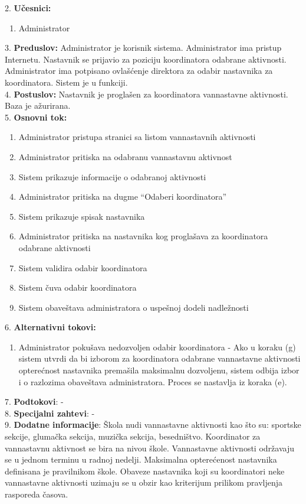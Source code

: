 \documentclass{article}
\begin{document}
2. \textbf{Učesnici:}
\begin{enumerate} [label=(\alph*)]
\item Administrator
\end{enumerate} 

3. \textbf{Preduslov:} Administrator je korisnik sistema. Administrator ima pristup Internetu. Nastavnik se prijavio za poziciju koordinatora odabrane aktivnosti. Administrator ima potpisano ovlašćenje direktora za odabir nastavnika za koordinatora. Sistem je u funkciji. \\

4. \textbf{Postuslov:} Nastavnik je proglašen za koordinatora vannastavne aktivnosti. Baza je ažurirana. \\

5. \textbf{Osnovni tok:} 
\begin{enumerate} [label=(\alph*)]
\item Administrator pristupa stranici sa listom vannastavnih aktivnosti
\item Administrator pritiska na odabranu vannastavnu aktivnost
\item Sistem prikazuje informacije o odabranoj aktivnosti
\item Administrator pritiska na dugme ``Odaberi koordinatora''
\item Sistem prikazuje spisak nastavnika
\item Administrator pritiska na nastavnika kog proglašava za koordinatora odabrane aktivnosti
\item Sistem validira odabir koordinatora
\item Sistem čuva odabir koordinatora
\item Sistem obaveštava administratora o uspešnoj dodeli nadležnosti
\end{enumerate}

6. \textbf{Alternativni tokovi:}
\begin{enumerate} [label=(\roman*)]
    \item Administrator pokušava nedozvoljen odabir koordinatora - Ako u koraku (g) sistem utvrdi da bi izborom za koordinatora odabrane vannastavne aktivnosti opterećnost nastavnika premašila maksimalnu dozvoljenu, sistem odbija izbor i o razlozima obaveštava administratora. Proces se nastavlja iz koraka (e).
\end{enumerate}

7. \textbf{Podtokovi}: - \\

8. \textbf{Specijalni zahtevi}: - \\

9. \textbf{Dodatne informacije}: Škola nudi vannastavne aktivnosti kao što su: sportske sekcije, glumačka sekcija, muzička sekcija, besedništvo. Koordinator za vannastavnu aktivnost se bira na nivou škole. Vannastavne aktivnosti održavaju se u jednom terminu u radnoj nedelji. Maksimalna opterećenost nastavnika definisana je pravilnikom škole. Obaveze nastavnika koji su koordinatori neke vannastavne aktivnosti uzimaju se u obzir kao kriterijum prilikom pravljenja rasporeda časova. \\
\end{document}
